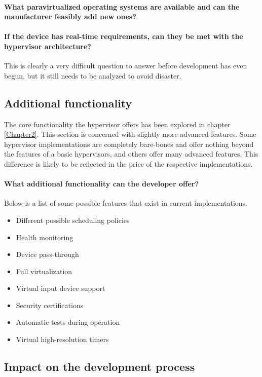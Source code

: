 \paragraph{What paravirtualized operating systems are available and can the manufacturer feasibly add new ones?}

\paragraph{If the device has real-time requirements, can they be met with the hypervisor architecture?}
This is clearly a very difficult question to answer before development has even begun, but it still needs to be analyzed to avoid disaster.
\subsection{Additional functionality}
The core functionality the hypervisor offers has been explored in chapter \ref{Chapter2}. This section is concerned with slightly more advanced features. Some hypervisor implementations are completely bare-bones and offer nothing beyond the features of a basic hypervisors, and others offer many advanced features. This difference is likely to be reflected in the price of the respective implementations.
\paragraph{What additional functionality can the developer offer?}
Below is a list of some possible features that exist in current implementations.
\begin{itemize}
    \item Different possible scheduling policies
    \item Health monitoring
    \item Device pass-through
    \item Full virtualization
    \item Virtual input device support
    \item Security certifications
    \item Automatic tests during operation
    \item Virtual high-resolution timers
\end{itemize}

\subsection{Impact on the development process}
